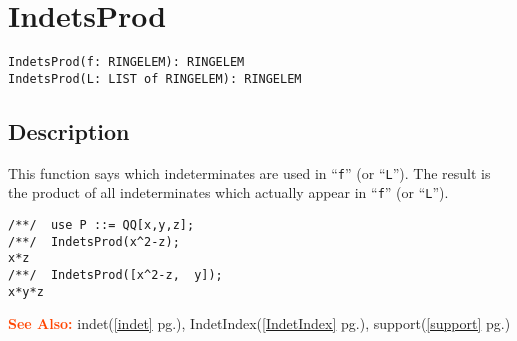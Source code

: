 \documentclass[a4paper]{mybook}
\newenvironment{command}{}{} %
\newcommand\SeeAlso{\par\textcolor{OrangeRed}{\textbf{\large See Also: }}}
\begin{document}
\section{IndetsProd}
\label{IndetsProd}
\begin{command} %


\begin{Verbatim}[label=syntax, rulecolor=\color{MidnightBlue},
frame=single]
IndetsProd(f: RINGELEM): RINGELEM
IndetsProd(L: LIST of RINGELEM): RINGELEM
\end{Verbatim}


\subsection*{Description}

This function says which indeterminates are used in ``\verb&f&'' (or ``\verb&L&'').
The result is the product of all indeterminates which actually appear
in ``\verb&f&'' (or ``\verb&L&'').
\begin{Verbatim}[label=example, rulecolor=\color{PineGreen}, frame=single]
/**/  use P ::= QQ[x,y,z];
/**/  IndetsProd(x^2-z);
x*z
/**/  IndetsProd([x^2-z,  y]);
x*y*z
\end{Verbatim}


\SeeAlso %
  indet(\ref{indet} pg.\pageref{indet}), 
    IndetIndex(\ref{IndetIndex} pg.\pageref{IndetIndex}), 
    support(\ref{support} pg.\pageref{support})
\end{command} %
\end{document}
